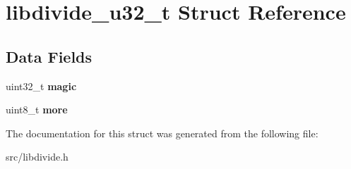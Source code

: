 \hypertarget{structlibdivide__u32__t}{}\section{libdivide\+\_\+u32\+\_\+t Struct Reference}
\label{structlibdivide__u32__t}
\subsection*{Data Fields}
\begin{DoxyCompactItemize}
\item 
\mbox{\label{structlibdivide__u32__t_a94420c6b723dd50d9ee89e5c3f45f012}} 
uint32\+\_\+t {\bfseries magic}
\item 
\mbox{\label{structlibdivide__u32__t_a933f89343bfc98f2788a2a4f88bb1967}} 
uint8\+\_\+t {\bfseries more}
\end{DoxyCompactItemize}


The documentation for this struct was generated from the following file\+:\begin{DoxyCompactItemize}
\item 
src/libdivide.\+h\end{DoxyCompactItemize}

